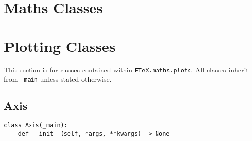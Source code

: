 \documentclass{article}
\begin{document}
\section{Maths Classes}\label{sec:maths_classes}

\section{Plotting Classes}\label{sec:plotting_classes}
This section is for classes contained within \verb|ETeX.maths.plots|. All classes inherit from \verb|_main| unless stated otherwise.
\subsection{Axis}\label{subsec:axis}
\begin{verbatim}
class Axis(_main):
	def __init__(self, *args, **kwargs) -> None
\end{verbatim}
\end{document}
